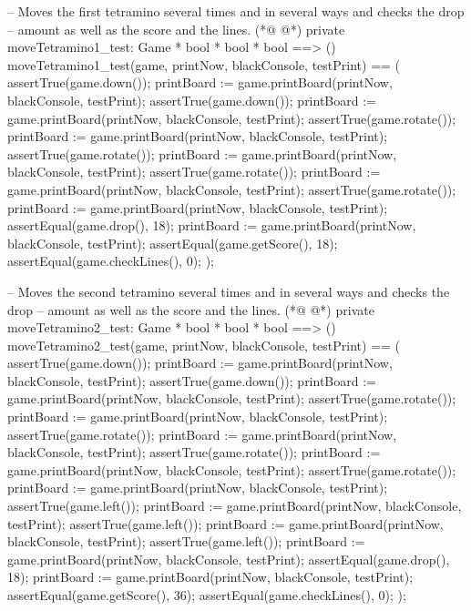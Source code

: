 \begin{vdmpp}[breaklines=true]
  -- Moves the first tetramino several times and in several ways and checks the drop
  -- amount as well as the score and the lines.
(*@
\label{moveTetramino1:test:290}
@*)
  private moveTetramino1_test: Game * bool * bool * bool ==> ()
  moveTetramino1_test(game, printNow, blackConsole, testPrint) == (
   assertTrue(game.down());
   printBoard := game.printBoard(printNow, blackConsole, testPrint);
   assertTrue(game.down());
   printBoard := game.printBoard(printNow, blackConsole, testPrint);
   assertTrue(game.rotate());
   printBoard := game.printBoard(printNow, blackConsole, testPrint);
   assertTrue(game.rotate());
   printBoard := game.printBoard(printNow, blackConsole, testPrint);
   assertTrue(game.rotate());
   printBoard := game.printBoard(printNow, blackConsole, testPrint);
   assertTrue(game.rotate());
   printBoard := game.printBoard(printNow, blackConsole, testPrint);
   assertEqual(game.drop(), 18);
   printBoard := game.printBoard(printNow, blackConsole, testPrint);
   assertEqual(game.getScore(), 18);
   assertEqual(game.checkLines(), 0);
  );
  
  -- Moves the second tetramino several times and in several ways and checks the drop
  -- amount as well as the score and the lines.
(*@
\label{moveTetramino2:test:312}
@*)
  private moveTetramino2_test: Game * bool * bool * bool ==> ()
  moveTetramino2_test(game, printNow, blackConsole, testPrint) == (
   assertTrue(game.down());
   printBoard := game.printBoard(printNow, blackConsole, testPrint);
   assertTrue(game.down());
   printBoard := game.printBoard(printNow, blackConsole, testPrint);
   assertTrue(game.rotate());
   printBoard := game.printBoard(printNow, blackConsole, testPrint);
   assertTrue(game.rotate());
   printBoard := game.printBoard(printNow, blackConsole, testPrint);
   assertTrue(game.rotate());
   printBoard := game.printBoard(printNow, blackConsole, testPrint);
   assertTrue(game.rotate());
   printBoard := game.printBoard(printNow, blackConsole, testPrint);
   assertTrue(game.left());
   printBoard := game.printBoard(printNow, blackConsole, testPrint);
   assertTrue(game.left());
   printBoard := game.printBoard(printNow, blackConsole, testPrint);
   assertTrue(game.left());
   printBoard := game.printBoard(printNow, blackConsole, testPrint);
   assertEqual(game.drop(), 18);
   printBoard := game.printBoard(printNow, blackConsole, testPrint);
   assertEqual(game.getScore(), 36);
   assertEqual(game.checkLines(), 0);
  );
  

\end{vdmpp}
